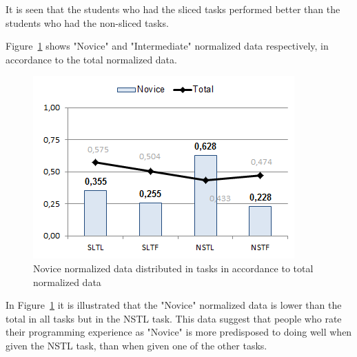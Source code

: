 \documentclass{sig-alternate-05-2015}
\begin{document}
It is seen that the students who had the sliced tasks performed better than the students who had the non-sliced tasks.

Figure~\ref{fig:Novice normalized data distributed in tasks in accordance to total normalized data} shows "Novice" and "Intermediate" normalized data respectively, in accordance to the total normalized data.

\begin{figure}[!ht]
	\centering
	\includegraphics[width=1\linewidth]{img11}
	\caption{Novice normalized data distributed in tasks in accordance to total normalized data}
	\label{fig:Novice normalized data distributed in tasks in accordance to total normalized data}
\end{figure}

In Figure~\ref{fig:Novice normalized data distributed in tasks in accordance to total normalized data} it is illustrated that the "Novice" normalized data is lower than the total in all tasks but in the NSTL task. This data suggest that people who rate their programming experience as "Novice" is more predisposed to doing well when given the NSTL task, than when given one of the other tasks.
\end{document}
